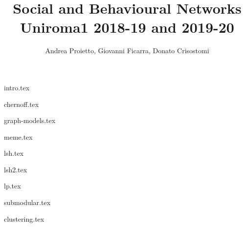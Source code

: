 \documentclass{report}
\title{
    Social and Behavioural Networks \\
    \large Uniroma1 2018-19 and 2019-20
}
\author{Andrea Proietto, Giovanni Ficarra, Donato Crisostomi}
\begin{document}
\maketitle

\tableofcontents


{intro.tex}

{chernoff.tex}

{graph-models.tex}

{meme.tex}
	
{lsh.tex}

{lsh2.tex}

{lp.tex}

{submodular.tex}

{clustering.tex}



\end{document}
